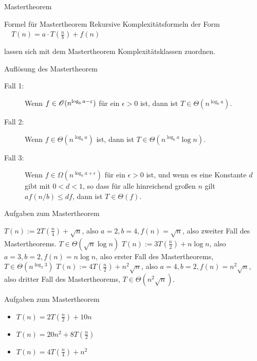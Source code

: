 \documentclass{beamer}
\begin{document}
\begin{frame}{Mastertheorem}
	\begin{block}{Formel für Mastertheorem}
		Rekursive Komplexitätsformeln der Form\\
		
		\vspace{.2cm}
		$\quad T(n) = a \cdot T(\frac{n}{b}) + f(n)$
		\vspace{.2cm}
		
		lassen sich mit dem Mastertheorem Komplexitätsklassen zuordnen.
	\end{block}

	\begin{block}{Auflösung des Mastertheorem}
		\begin{description}
			\item[Fall 1:] Wenn $f \in \mathscr{O}(n^{\log_b a -\varepsilon})$ für ein
			$\epsilon>0$ ist, dann ist $T\in \Theta(n^{\log_b a})$.
			\item[Fall 2:] Wenn $f \in \Theta(n^{\log_b a})$ ist, dann ist
			$T\in \Theta(n^{\log_b a}\log n)$.
			\item[Fall 3:] Wenn $f \in \Omega(n^{\log_b a +\epsilon})$ für ein
			$\epsilon>0$ ist, und wenn es eine Konstante $d$ gibt mit $0<d<1$, so
			dass für alle hinreichend großen $n$ gilt $af(n/b)\leq d f$, dann
			ist $T\in \Theta(f)$.
		\end{description}
	\end{block}
\end{frame}

\begin{frame}{Aufgaben zum Mastertheorem}
	\begin{itemize}
		\pitem $T(n) := 2 T(\frac{n}{4}) + \sqrt{n}$\pause, also $a=2, b=4, f(n) = \sqrt{n}$\pause, also zweiter Fall des Mastertheorems\pause. $T \in \Theta (\sqrt{n}\log n)$
		\pitem $T(n) := 3 T(\frac{n}{2}) + n\log n$\pause, also $a = 3, b=2, f(n) = n\log n$\pause, also erster Fall des Mastertheorems\pause, $T \in \Theta(n^{\log_2 3})$
		\pitem $T(n) := 4 T(\frac{n}{2}) + n^2\sqrt{n}$\pause, also $a = 4, b=2, f(n) = n^2\sqrt{n}$\pause, also dritter Fall des Mastertheorems\pause, $T \in \Theta(n^2\sqrt{n})$.
	\end{itemize}
\end{frame}

\begin{frame}{Aufgaben zum Mastertheorem}
\begin{itemize}
	\item $T(n)=2T(\frac{n}{2})+10n$
	\item $T(n)=20n^2+8T(\frac{n}{2})$
	\item $T(n)=4T(\frac{n}{4})+n^2$
\end{itemize}
\end{frame}
\end{document}
